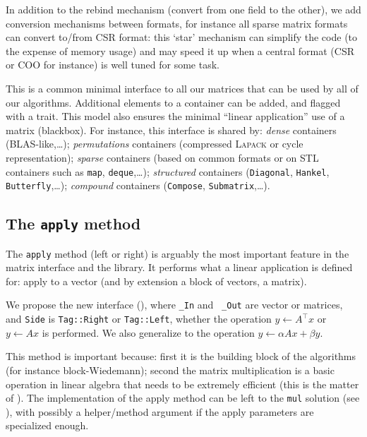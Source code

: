 %
		In addition to the rebind mechanism (convert from one field to the other), we add
%
	 conversion mechanisms between formats, for instance all
	 sparse matrix formats can convert to/from CSR format:  this `star'
	 mechanism can simplify the code (to the expense of memory usage) and
	 may speed it up when a central format (CSR or COO for instance) is
	 well tuned for some task.
%
	 \par
%
This is a common minimal interface to all our matrices that can be used by all
of our algorithms. Additional elements to a container can be added, and flagged
with a trait. This model also ensures the minimal ``linear application'' use of a
matrix (blackbox).  For instance, this interface is shared by: \emph{dense}
containers (BLAS-like,\ldots); \emph{permutations} containers (compressed
\textsc{Lapack} or cycle representation); \emph{sparse} containers (based on
common formats or on STL containers such as {\tt map}, {\tt deque},\ldots);
\emph{structured} containers ({\tt Diagonal}, {\tt Hankel}, {\tt Butterfly},\ldots);
\emph{compound} containers ({\tt Compose}, {\tt Submatrix},\ldots).
%
\subsection{The \texttt{apply} method}\label{ssec:apply}
%
%
\par
%
The \texttt{apply} method (left or right) is arguably the most important
feature in the matrix interface and the \linbox library. It performs what a
linear application is defined for: apply to a vector (and by extension  a block
of vectors, \ie a matrix).
%
\par
%
We propose the new interface (), where {\tt \_In} and {\tt
\_Out} are vector or matrices, and {\tt Side} is {\tt Tag::Right} or
{\tt Tag::Left}, whether the operation $y \gets A^{\top} x$ or  $y \gets A x$ is
performed. We also generalize to the operation $y \gets \alpha A x + \beta y$.
%

%
This method is important because: first it is the building block of the \applin
algorithms (for instance block-Wiedemann); second the matrix multiplication is
a basic operation in linear algebra that needs to be extremely efficient (this
is the matter of ).
%
%
%
The implementation of the apply method can be left to the {\tt mul} solution
(see ), with possibly a helper/method argument if the apply
parameters are specialized enough.
%
%
%
